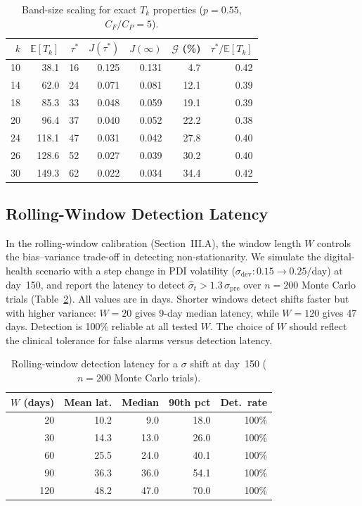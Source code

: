 \documentclass[pdflatex,sn-mathphys-num]{sn-jnl}
\theoremstyle{definition}
\newcommand{\E}{\mathbb{E}}
\numberwithin{equation}{section}
\begin{document}
\begin{table}[htbp]
\centering
\caption{Band-size scaling for exact $T_k$ properties ($p{=}0.55$, $C_F/C_P{=}5$).}
\label{tab:band}
\small
\begin{tabular}{rrrrrrr}
\toprule
$k$ & $\E[T_k]$ & $\tau^*$ & $J(\tau^*)$ & $J(\infty)$ & $\mathcal{G}$ (\%) & $\tau^*/\E[T_k]$ \\
\midrule
10 & 38.1 & 16 & 0.125 & 0.131 & 4.7 & 0.42 \\
14 & 62.0 & 24 & 0.071 & 0.081 & 12.1 & 0.39 \\
18 & 85.3 & 33 & 0.048 & 0.059 & 19.1 & 0.39 \\
20 & 96.4 & 37 & 0.040 & 0.052 & 22.2 & 0.38 \\
24 & 118.1 & 47 & 0.031 & 0.042 & 27.8 & 0.40 \\
26 & 128.6 & 52 & 0.027 & 0.039 & 30.2 & 0.40 \\
30 & 149.3 & 62 & 0.022 & 0.034 & 34.4 & 0.42 \\
\bottomrule
\end{tabular}
\end{table}

\subsection{Rolling-Window Detection Latency}

In the rolling-window calibration (Section~III.A), the window length $W$ controls the bias--variance trade-off in detecting non-stationarity. We simulate the digital-health scenario with a step change in PDI volatility ($\sigma_{\mathrm{dev}}: 0.15\to 0.25$/day) at day~150, and report the latency to detect $\hat\sigma_t > 1.3\,\sigma_{\mathrm{pre}}$ over $n=200$ Monte Carlo trials (Table~\ref{tab:rolling}). All values are in days. Shorter windows detect shifts faster but with higher variance: $W{=}20$ gives 9-day median latency, while $W{=}120$ gives 47 days. Detection is 100\% reliable at all tested $W$. The choice of $W$ should reflect the clinical tolerance for false alarms versus detection latency.

\begin{table}[htbp]
\centering
\caption{Rolling-window detection latency for a $\sigma$ shift at day~150 ($n{=}200$ Monte Carlo trials).}
\label{tab:rolling}
\small
\begin{tabular}{rrrrr}
\toprule
$W$ (days) & Mean lat. & Median & 90th pct & Det.\ rate \\
\midrule
20 & 10.2 & 9.0 & 18.0 & 100\% \\
30 & 14.3 & 13.0 & 26.0 & 100\% \\
60 & 25.5 & 24.0 & 40.1 & 100\% \\
90 & 36.3 & 36.0 & 54.1 & 100\% \\
120 & 48.2 & 47.0 & 70.0 & 100\% \\
\bottomrule
\end{tabular}
\end{table}
\end{document}
